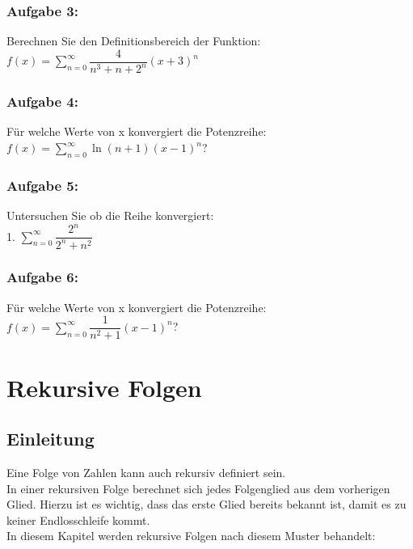\documentclass[11pt,final]{scrreprt}
\newcommand{\br} {\medskip\\}
\begin{document}
\subsection*{Aufgabe 3:}
Berechnen Sie den Definitionsbereich der Funktion:\\
\hspace*{2em}$ f(x) = \sum\limits_{n=0}^\infty \dfrac{4}{n^3+n+2^n}(x+3)^n$

\subsection*{Aufgabe 4:}
Für welche Werte von x konvergiert die Potenzreihe:\\
\hspace*{2em}$ f(x) = \sum\limits_{n=0}^\infty \ln(n+1)(x-1)^n$?

\subsection*{Aufgabe 5:}
Untersuchen Sie ob die Reihe konvergiert:\\
\hspace*{2em}1. $ \sum\limits_{n=0}^\infty \dfrac{2^n}{2^n+n^2}$

\subsection*{Aufgabe 6:}
Für welche Werte von x konvergiert die Potenzreihe:\\
\hspace*{2em}$ f(x) = \sum\limits_{n=0}^\infty \dfrac{1}{n^2+1}(x-1)^n$?

\chapter{Rekursive Folgen}

\section{Einleitung}

Eine Folge von Zahlen kann auch rekursiv definiert sein.\\
In einer rekursiven Folge berechnet sich jedes Folgenglied aus dem vorherigen Glied. Hierzu ist es wichtig, dass das erste Glied bereits bekannt ist, damit es zu keiner Endlosschleife kommt.\br
In diesem Kapitel werden rekursive Folgen nach diesem Muster behandelt:\\
\end{document}
